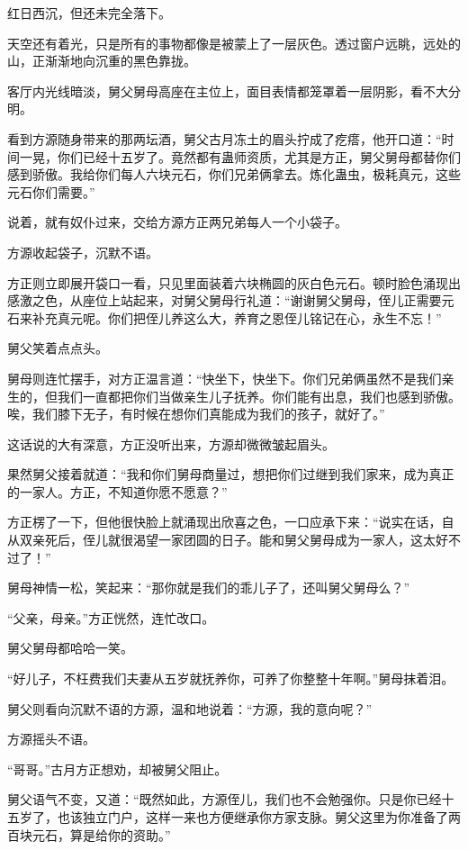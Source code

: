 
\begin{this_body}

红日西沉，但还未完全落下。

天空还有着光，只是所有的事物都像是被蒙上了一层灰色。透过窗户远眺，远处的山，正渐渐地向沉重的黑色靠拢。

客厅内光线暗淡，舅父舅母高座在主位上，面目表情都笼罩着一层阴影，看不大分明。

看到方源随身带来的那两坛酒，舅父古月冻土的眉头拧成了疙瘩，他开口道：“时间一晃，你们已经十五岁了。竟然都有蛊师资质，尤其是方正，舅父舅母都替你们感到骄傲。我给你们每人六块元石，你们兄弟俩拿去。炼化蛊虫，极耗真元，这些元石你们需要。”

说着，就有奴仆过来，交给方源方正两兄弟每人一个小袋子。

方源收起袋子，沉默不语。

方正则立即展开袋口一看，只见里面装着六块椭圆的灰白色元石。顿时脸色涌现出感激之色，从座位上站起来，对舅父舅母行礼道：“谢谢舅父舅母，侄儿正需要元石来补充真元呢。你们把侄儿养这么大，养育之恩侄儿铭记在心，永生不忘！”

舅父笑着点点头。

舅母则连忙摆手，对方正温言道：“快坐下，快坐下。你们兄弟俩虽然不是我们亲生的，但我们一直都把你们当做亲生儿子抚养。你们能有出息，我们也感到骄傲。唉，我们膝下无子，有时候在想你们真能成为我们的孩子，就好了。”

这话说的大有深意，方正没听出来，方源却微微皱起眉头。

果然舅父接着就道：“我和你们舅母商量过，想把你们过继到我们家来，成为真正的一家人。方正，不知道你愿不愿意？”

方正楞了一下，但他很快脸上就涌现出欣喜之色，一口应承下来：“说实在话，自从双亲死后，侄儿就很渴望一家团圆的日子。能和舅父舅母成为一家人，这太好不过了！”

舅母神情一松，笑起来：“那你就是我们的乖儿子了，还叫舅父舅母么？”

“父亲，母亲。”方正恍然，连忙改口。

舅父舅母都哈哈一笑。

“好儿子，不枉费我们夫妻从五岁就抚养你，可养了你整整十年啊。”舅母抹着泪。

舅父则看向沉默不语的方源，温和地说着：“方源，我的意向呢？”

方源摇头不语。

“哥哥。”古月方正想劝，却被舅父阻止。

舅父语气不变，又道：“既然如此，方源侄儿，我们也不会勉强你。只是你已经十五岁了，也该独立门户，这样一来也方便继承你方家支脉。舅父这里为你准备了两百块元石，算是给你的资助。”


\end{this_body}
